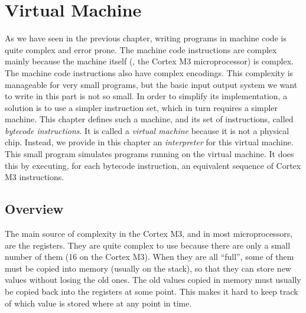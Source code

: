 
\renewcommand{\rustfile}{chapter3}
\setcounter{rustid}{0}

\chapter{Virtual Machine}\label{chapter:virtual-machine}

As we have seen in the previous chapter, writing programs in machine code is
quite complex and error prone. The machine code instructions are complex mainly
because the machine itself (\ie, the Cortex M3 microprocessor) is complex. The
machine code instructions also have complex encodings. This complexity is
manageable for very small programs, but the basic input output system we want
to write in this part is not so small. In order to simplify its implementation,
a solution is to use a simpler instruction set, which in turn requires a
simpler machine. This chapter defines such a machine, and its set of
instructions, called {\em bytecode instructions}. It is called a {\em virtual
machine} because it is not a physical chip. Instead, we provide in this chapter
an {\em interpreter} for this virtual machine. This small program simulates
programs running on the virtual machine. It does this by executing, for each
bytecode instruction, an equivalent sequence of Cortex M3 instructions.

\section{Overview}

The main source of complexity in the Cortex M3, and in most microprocessors,
are the registers. They are quite complex to use because there are only a small
number of them (16 on the Cortex M3). When they are all ``full'', some of them
must be copied into memory (usually on the stack), so that they can store new
values without losing the old ones. The old values copied in memory must
usually be copied back into the registers at some point. This makes it hard to
keep track of which value is stored where at any point in time.

